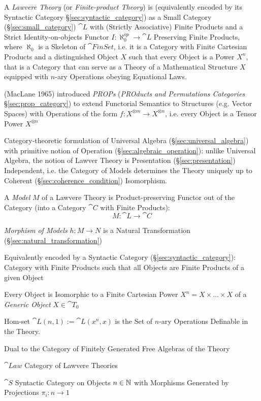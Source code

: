 A \emph{Lawvere Theory} (or \emph{Finite-product Theory}) is (equivalently
encoded by its Syntactic Category \S\ref{sec:syntactic_category}) as a Small
Category (\S\ref{sec:small_category}) $\cat{L}$ with (Strictly Associative)
Finite Products and a Strict Identity-on-objects Functor $I : \aleph_0^{op}
\rightarrow \cat{L}$ Preserving Finite Products, where $\aleph_0$ is a Skeleton
of $\cat{FinSet}$, i.e. it is a Category with Finite Cartesian Products and a
distinguished Object $X$ such that every Object is a Power $X^n$, that is a
Category that can serve as a Theory of a Mathematical Structure $X$ equipped
with $n$-ary Operations obeying Equational Laws.

\fist (MacLane 1965) introduced \emph{PROPs} (\emph{PROducts and Permutations
  Categories} \S\ref{sec:prop_category}) to extend Functorial Semantics to
Structures (e.g. Vector Spaces) with Operations of the form $f : X^{\otimes m}
\rightarrow X^{\otimes n}$, i.e. every Object is a Tensor Power $X^{\otimes n}$

Category-theoretic formulation of Universal Algebra
(\S\ref{sec:universal_algebra}) with primitive notion of Operation
(\S\ref{sec:algebraic_operation}): unlike Universal Algebra, the notion of
Lawver Theory is Presentation (\S\ref{sec:presentation}) Independent, i.e. the
Category of Models determines the Theory uniquely up to Coherent
(\S\ref{sec:coherence_condition}) Isomorphism. \cite{hyland-power06}

A \emph{Model} $M$ of a Lawvere Theory is Product-preserving Functor out of the
Category (into a Category $\cat{C}$ with Finite Products):
\[
  M : \cat{L} \rightarrow \cat{C}
\]

\emph{Morphism of Models} $h : M \rightarrow N$ is a Natural Transformation
(\S\ref{sec:natural_transformation})

Equivalently encoded by a Syntactic Category (\S\ref{sec:syntactic_category}):
Category with Finite Products such that all Objects are Finite Products of a
given Object

Every Object is Isomorphic to a Finite Cartesian Power $X^n = X \times \ldots
\times X$ of a \emph{Generic Object} $X \in \cat{T}_0$

Hom-set $\cat{L}(n,1) := \cat{L}(x^n,x)$ is the Set of $n$-ary Operations
Definable in the Theory.

Dual to the Category of Finitely Generated Free Algebras of the Theory

$\cat{Law}$ Category of Lawvere Theories

$\cat{S}$ Syntactic Category on Objects $n \in \mathbb{N}$ with Morphisms Generated
by Projections $\pi_i : n \rightarrow 1$


